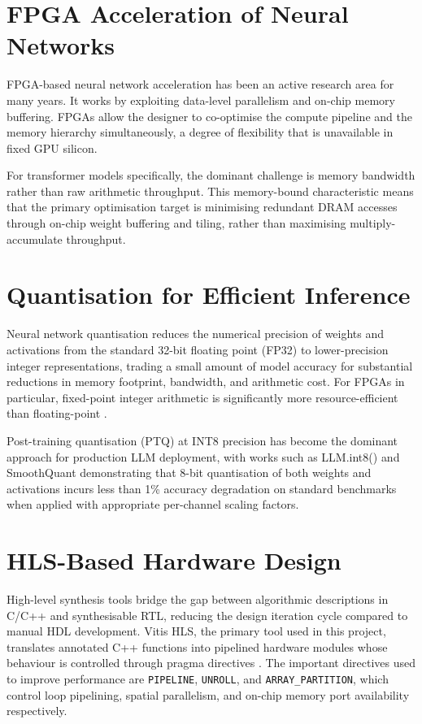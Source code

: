 \section{FPGA Acceleration of Neural Networks}
\label{sec:fpga_acceleration}

FPGA-based neural network acceleration has been an active research area for many years. 
It works by exploiting data-level parallelism and on-chip memory buffering. 
FPGAs allow the designer to co-optimise the compute pipeline and the
memory hierarchy simultaneously, a degree of flexibility that is unavailable
in fixed GPU silicon.

For transformer models specifically, the dominant challenge is memory bandwidth
rather than raw arithmetic throughput. This memory-bound characteristic means that the primary
optimisation target is minimising redundant DRAM accesses through on-chip
weight buffering and tiling, rather than maximising multiply-accumulate
throughput.

\section{Quantisation for Efficient Inference}
\label{sec:quantisation}

Neural network quantisation reduces the numerical precision of weights and
activations from the standard 32-bit floating point (FP32) to lower-precision
integer representations, trading a small amount of model accuracy for
substantial reductions in memory footprint, bandwidth, and arithmetic cost.
For FPGAs in particular, fixed-point integer arithmetic is significantly more
resource-efficient than floating-point \cite{kim2021ibert}.

Post-training quantisation (PTQ) at INT8 precision has become the dominant
approach for production LLM deployment, with works such as LLM.int8()
\cite{dettmers2022llmint8} and SmoothQuant \cite{xiao2023smoothquant} demonstrating that
8-bit quantisation of both weights and activations incurs less than 1\%
accuracy degradation on standard benchmarks when applied with appropriate
per-channel scaling factors.


\section{HLS-Based Hardware Design}
\label{sec:hls_design}

High-level synthesis tools bridge the gap between algorithmic descriptions in
C/C++ and synthesisable RTL, reducing the design iteration cycle
compared to manual HDL development. Vitis HLS, the primary tool used in this
project, translates annotated C++ functions into pipelined hardware modules
whose behaviour is controlled through pragma directives \cite{xilinx2021vitishls}. 
The important directives used to improve performance are 
\texttt{PIPELINE}, \texttt{UNROLL}, and \texttt{ARRAY\_PARTITION}, 
which control loop pipelining, spatial
parallelism, and on-chip memory port availability respectively.

